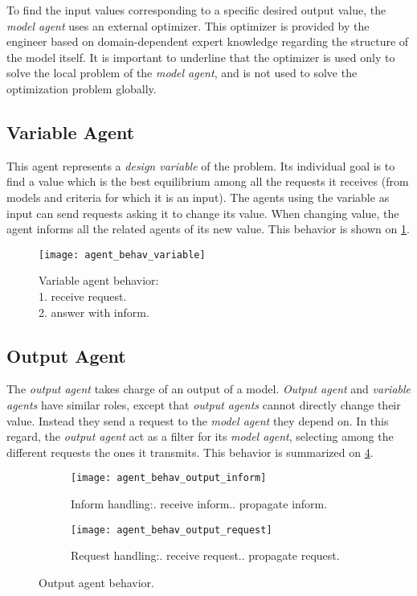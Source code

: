 To find the input values corresponding to a specific desired output value, the \emph{model agent} uses an external optimizer. This optimizer is provided by the engineer based on domain-dependent expert knowledge regarding the structure of the model itself.
It is important to underline that the optimizer is used only to solve the local problem of the \emph{model agent}, and is not used to solve the optimization problem globally.

\subsection{Variable Agent}

This agent represents a \emph{design variable} of the problem. Its individual goal is to find a value which is the best equilibrium among all the requests it receives (from models and criteria for which it is an input). The agents using the variable as input can send requests asking it to change its value. When changing value, the agent informs all the related agents of its new value. This behavior is shown on \figurename{} \ref{agent_behav_variable}. 

\begin{figure}
\centering
\texttt{[image: agent\_behav\_variable]}
\caption{Variable agent behavior:\\1. receive request.\\2. answer with inform.}\label{agent_behav_variable}
\end{figure}

\subsection{Output Agent}
The \emph{output agent} takes charge of an output of a model. \emph{Output agent} and \emph{variable agents} have similar roles, except that \emph{output agents} cannot directly change their value. Instead they send a request to the \emph{model agent} they depend on. In this regard, the \emph{output agent} act as a filter for its \emph{model agent}, selecting among the different requests the ones it transmits. This behavior is summarized on \figurename{} \ref{agent_behav_output}.

\begin{figure}
\centering
\begin{subfigure}{0.25\textwidth}
		\centering
		\texttt{[image: agent\_behav\_output\_inform]}
		\caption{Inform handling:. receive inform.. propagate inform.}\label{agent_behav_output:inf}
\end{subfigure}
\qquad
\begin{subfigure}{0.25\textwidth}
		\centering
		\texttt{[image: agent\_behav\_output\_request]}
		\caption{Request handling:. receive request.. propagate request.}\label{agent_behav_output:req}
\end{subfigure}
\caption{Output agent behavior.}\label{agent_behav_output}
\end{figure}

